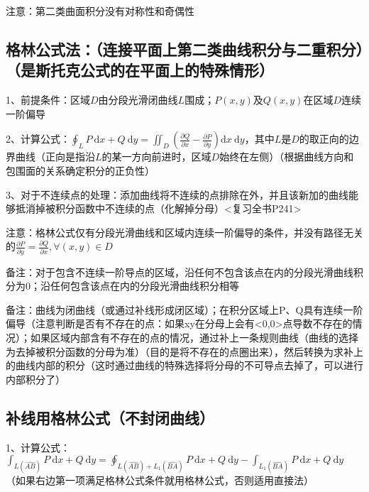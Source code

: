 注意：第二类曲面积分没有对称性和奇偶性



\subsection{格林公式法：（连接平面上第二类曲线积分与二重积分）（是斯托克公式的在平面上的特殊情形）}

1、前提条件：区域$D$由分段光滑闭曲线$L$围成；$P(x, y)$及$Q(x, y)$在区域$D$连续一阶偏导

2、计算公式：$\oint_{L} P \mathrm{~d} x+Q \mathrm{~d} y=\iint_{D}\left(\frac{\partial Q}{\partial x}-\frac{\partial P}{\partial y}\right) \mathrm{d} x \mathrm{~d} y$，其中$L$是$D$的取正向的边界曲线（正向是指沿$L$的某一方向前进时，区域$D$始终在左侧）（根据曲线方向和包围面的关系确定积分的正负性）

3、对于不连续点的处理：添加曲线将不连续的点排除在外，并且该新加的曲线能够抵消掉被积分函数中不连续的点（化解掉分母）<复习全书P241>

注意：格林公式仅有分段光滑曲线和区域内连续一阶偏导的条件，并没有路径无关的$\frac{\partial P}{\partial y}=\frac{\partial Q}{\partial x}, \forall(x, y) \in D$

备注：对于包含不连续一阶导点的区域，沿任何不包含该点在内的分段光滑曲线积分为0；沿任何包含该点在内的分段光滑曲线积分相等

备注：曲线为闭曲线（或通过补线形成闭区域）；在积分区域上P、Q具有连续一阶偏导（注意判断是否有不存在的点：如果xy在分母上会有<0,0>点导数不存在的情况）；如果区域内部含有不存在的点的情况，通过补上一条规则曲线（曲线的选择为去掉被积分函数的分母为准）（目的是将不存在的点圈出来），然后转换为求补上的曲线内部的积分（这时通过曲线的特殊选择将分母的不可导点去掉了，可以进行内部积分了）



\subsection{补线用格林公式（不封闭曲线）}

1、计算公式：$\int_{L(\widehat{A B})} P \mathrm{~d} x+Q \mathrm{~d} y=\oint_{L(\widehat{A B})+L_{1}(\widehat{B A})} P \mathrm{~d} x+Q \mathrm{~d} y-\int_{L_{1}(\widehat{BA})} P \mathrm{~d} x+Q \mathrm{~d} y$（如果右边第一项满足格林公式条件就用格林公式，否则适用直接法）




